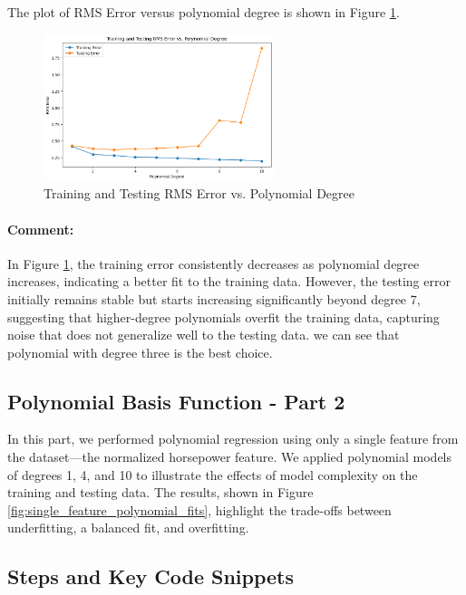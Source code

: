 \documentclass{article}
\begin{document}
	The plot of RMS Error versus polynomial degree is shown in Figure \ref{fig:rms_error_vs_degree}.
	
	\begin{figure}[h!]
		\centering
		\includegraphics[width=0.6\textwidth]{./images/q4_part1.png}
		\caption{Training and Testing RMS Error vs. Polynomial Degree}
		\label{fig:rms_error_vs_degree}
	\end{figure}
	
	\paragraph{Comment:} In Figure \ref{fig:rms_error_vs_degree}, the training error consistently decreases as polynomial degree increases, indicating a better fit to the training data. However, the testing error initially remains stable but starts increasing significantly beyond degree 7, suggesting that higher-degree polynomials overfit the training data, capturing noise that does not generalize well to the testing data. we can see that polynomial with degree three is the best choice.
	
	\subsection*{Polynomial Basis Function - Part 2}
	
	In this part, we performed polynomial regression using only a single feature from the dataset—the normalized horsepower feature. We applied polynomial models of degrees 1, 4, and 10 to illustrate the effects of model complexity on the training and testing data. The results, shown in Figure \ref{fig:single_feature_polynomial_fits}, highlight the trade-offs between underfitting, a balanced fit, and overfitting.
	
	\subsection*{Steps and Key Code Snippets}
	
\end{document}
